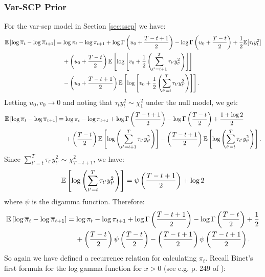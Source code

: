 \subsubsection{Var-SCP Prior}

For the var-scp model in Section \ref{sec:sscp} we have:
\small
\begin{align*}
    \mathbb{E}\left[\log\overline{\pi}_t - \log \overline{\pi}_{t+1} \right] &= \log \pi_t- \log \pi_{t+1} +\log \Gamma\left(u_0 +\frac{ T-t+1}{2}\right) - \log \Gamma\left(u_0 +\frac{ T-t}{2}\right) + \frac{1}{2} \mathbb{E}[\tau_ty_t^2] \\
    &\quad \: + \left(u_0 + \frac{T - t}{2}\right)\mathbb{E}\left[\log\left[v_0 +\frac{1}{2}\left(\sum_{t'=t+1}^T \tau_{t'}y_{t'}^2\right)\right]\right] \\
     &\quad \:- \left(u_0 + \frac{T - t +1}{2}\right)\mathbb{E}\left[\log\left[v_0 +\frac{1}{2}\left(\sum_{t'=t}^T \tau_{t'}y_{t'}^2\right)\right]\right].
\end{align*}
\normalsize
Letting $u_0,v_0 \to 0$ and noting that $\tau_{t}y^2_{t} \sim \chi^2_1$ under the null model, we get:
\small
\begin{align*}
    \mathbb{E}\left[\log\overline{\pi}_t - \log \overline{\pi}_{t+1} \right] &= \log \pi_t- \log \pi_{t+1} +\log \Gamma\left(\frac{T-t+1}{2}\right) - \log \Gamma\left(\frac{T-t}{2}\right) + \frac{1 + \log 2}{2}\\
    &\quad \: + \left(\frac{T - t}{2}\right)\mathbb{E}\left[\log\left(\sum_{t'=t+1}^T \tau_{t'}y_{t'}^2\right)\right] - \left(\frac{T - t +1}{2}\right)\mathbb{E}\left[\log\left(\sum_{t'=t}^T \tau_{t'}y_{t'}^2\right)\right].
\end{align*}
\normalsize
Since $\sum_{t'=t}^T \tau_{t'}y_{t'}^2 \sim \chi^2_{T-t+1}$, we have:
\begin{align*}
    \mathbb{E}\left[\log\left(\sum_{t'=t}^T \tau_{t'}y_{t'}^2\right)\right] = \psi\left(\frac{T-t+1}{2}\right) + \log 2
\end{align*}
where $\psi$ is the digamma function. Therefore:
\begin{align*}
    \mathbb{E}\left[\log\overline{\pi}_t - \log \overline{\pi}_{t+1} \right] &= \log \pi_t- \log \pi_{t+1} +\log \Gamma\left(\frac{T-t+1}{2}\right) - \log \Gamma\left(\frac{T-t}{2}\right) + \frac{1}{2}\\
    &\quad \: + \left(\frac{T - t}{2}\right)\psi\left(\frac{T-t}{2}\right)  - \left(\frac{T - t +1}{2}\right)\psi\left(\frac{T-t+1}{2}\right).
\end{align*}
So again we have defined a recurrence relation for calculating $\pi_t$. Recall Binet's first formula for the log gamma function for $x > 0$ (see e.g. p. 249 of \citealp{Whittaker96}): 
